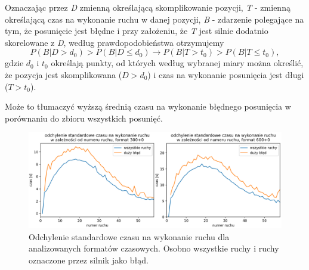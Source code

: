 \documentclass[inzynierska]{pwr_wmat_praca_dyplomowa}
\theoremstyle{plain}
\numberwithin{theorem}{chapter}
\theoremstyle{definition}
\numberwithin{theorem}{chapter}
\begin{document}
Oznaczając przez \textit{D} zmienną określającą skomplikowanie pozycji, \textit{T} - zmienną określającą czas na wykonanie ruchu w danej pozycji, \textit{B} - zdarzenie polegające na tym, że posunięcie jest błędne i przy założeniu, że \textit{T} jest silnie dodatnio skorelowane z \textit{D}, według prawdopodobieństwa otrzymujemy %
\begin{equation}
	P(B|D>d_0) > P(B|D\leq d_0) \rightarrow P(B|T>t_0) > P(B|T\leq t_0),
\end{equation}
gdzie $d_0$ i $t_0$ określają punkty, od których według wybranej miary można określić, że pozycja jest skomplikowana ($D>d_0$) i czas na wykonanie posunięcia jest długi ($T>t_0$).


Może to tłumaczyć wyższą średnią czasu na wykonanie błędnego posunięcia w porównaniu do zbioru wszystkich posunięć.
\begin{figure}[h]
	\centering
	\includegraphics[width=\textwidth]{std_czas_na_ruch.png}
	\caption{Odchylenie standardowe czasu na wykonanie ruchu dla analizowanych formatów czasowych. Osobno wszystkie ruchy i ruchy oznaczone przez silnik jako błąd.}
	\label{rys:std_czas_na_ruch}
\end{figure}
\end{document}
